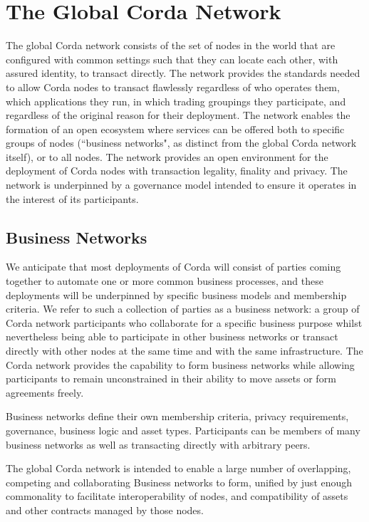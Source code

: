 \documentclass{article}
\begin{document}
\section{The Global Corda Network}
The global Corda network consists of the set of nodes in the world that are configured with common settings such that they can locate each other, with assured identity, to transact directly. The network provides the standards needed to allow Corda nodes to transact flawlessly regardless of who operates them, which applications they run, in which trading groupings they participate, and regardless of the original reason for their deployment. The network enables the formation of an open ecosystem where services can be offered both to specific groups of nodes (``business networks", as distinct from the global Corda network itself), or to all nodes. The network provides an open environment for the deployment of Corda nodes with transaction legality, finality and privacy. The network is underpinned by a governance model intended to ensure it operates in the interest of its participants.

\subsection{Business Networks} \label{businessnetworks}
We anticipate that most deployments of Corda will consist of parties coming together to automate one or more common business processes, and these deployments will be underpinned by specific business models and membership criteria. We refer to such a collection of parties as a business network: a group of Corda network participants who collaborate for a specific business purpose whilst nevertheless being able to participate in other business networks or transact directly with other nodes at the same time and with the same infrastructure. The Corda network provides the capability to form business networks while allowing participants to remain unconstrained in their ability to move assets or form agreements freely.

Business networks define their own membership criteria, privacy requirements, governance, business logic and asset types. Participants can be members of many business networks as well as transacting directly with arbitrary peers.

The global Corda network is intended to enable a large number of overlapping, competing and collaborating Business networks to form, unified by just enough commonality to facilitate interoperability of nodes, and compatibility of assets and other contracts managed by those nodes.
\end{document}

